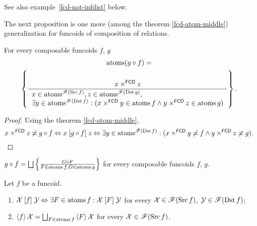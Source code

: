 \begin{rem}
See also example~\ref{fcd-not-infdist} below.
\end{rem}

The next proposition is one more (among the theorem \ref{fcd-atom-middle})
generalization for funcoids of composition of relations.
\begin{prop}\label{fcd-at-comp}
For every composable funcoids $f$, $g$
\begin{multline*}
\operatorname{atoms}(g\circ f)=\\
\left\{ \frac{x\times^{\mathsf{FCD}}z}{\begin{array}{l}
x\in\operatorname{atoms}^{\mathscr{F}(\operatorname{Src} f)},z\in\operatorname{atoms}^{\mathscr{F}(\operatorname{Dst} g)},\\
\exists y\in\operatorname{atoms}^{\mathscr{F}(\operatorname{Dst} f)}:(x\times^{\mathsf{FCD}}y\in\operatorname{atoms}
f\land y\times^{\mathsf{FCD}}z\in\operatorname{atoms} g)
\end{array}}\right\}.
\end{multline*}
\end{prop}
\begin{proof}
Using the theorem \ref{fcd-atom-middle},
\[
x\times^{\mathsf{FCD}}z\not\asymp g\circ f\Leftrightarrow x\mathrel{\left[g\circ
f\right]}z\Leftrightarrow\exists y\in\operatorname{atoms}^{\mathscr{F}(\operatorname{Dst}
f)}:(x\times^{\mathsf{FCD}}y\not\asymp f\land y\times^{\mathsf{FCD}}z\not\asymp g).
\]
\end{proof}
\begin{cor}
$g\circ f=\bigsqcup\setcond{G\circ F}{F\in\atoms f,G\in\atoms g}$
for every composable funcoids $f$, $g$.\end{cor}
\begin{thm}
Let $f$ be a funcoid.
\begin{enumerate}
\item \label{ffilt-r}$\mathcal{X}\mathrel{\left[f\right]}\mathcal{Y}\Leftrightarrow\exists
F\in\operatorname{atoms} f:\mathcal{X}\mathrel{\left[F\right]}\mathcal{Y}$
for every $\mathcal{X}\in\mathscr{F}(\operatorname{Src} f)$, $\mathcal{Y}\in\mathscr{F}(\operatorname{Dst}
f)$;
\item \label{ffilt-f}$\supfun f\mathcal{X}=\bigsqcup_{F\in\atoms f}\supfun
F\mathcal{X}$
for every $\mathcal{X}\in\mathscr{F}(\operatorname{Src} f)$.
\end{enumerate}
\end{thm}

